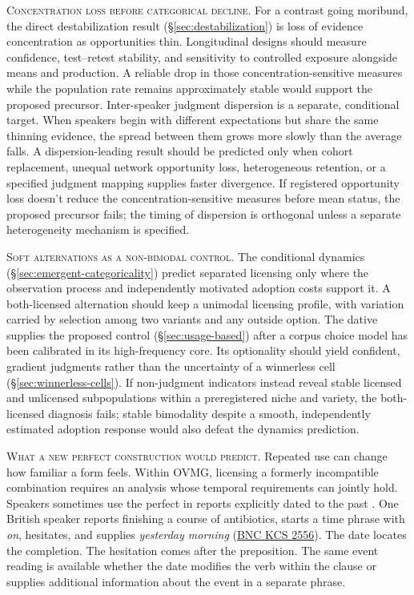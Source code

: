 \documentclass[12pt,letterpaper]{article}
\newcommand{\mention}[1]{\textit{#1}}
\begin{document}
\noindent\textsc{Concentration loss before categorical decline.} For a contrast
going moribund, the direct destabilization result
(\S\ref{sec:destabilization}) is loss of evidence concentration as
opportunities thin. Longitudinal designs should measure confidence,
test--retest stability, and sensitivity to controlled exposure alongside means
and production. A reliable drop in those concentration-sensitive measures while
the population rate remains approximately stable would support the proposed
precursor. Inter-speaker judgment dispersion is a separate, conditional target.
When speakers begin with different expectations but share the same thinning
evidence, the spread between them grows more slowly than the average falls. A
dispersion-leading result should be predicted only when cohort replacement,
unequal network opportunity loss, heterogeneous retention, or a specified
judgment mapping supplies faster divergence.
If registered opportunity loss doesn't reduce the concentration-sensitive
measures before mean status, the proposed precursor fails; the timing of
dispersion is orthogonal unless a separate heterogeneity mechanism is specified.

\noindent\textsc{Soft alternations as a non-bimodal control.} The conditional
dynamics (\S\ref{sec:emergent-categoricality}) predict separated licensing only
where the observation process and independently motivated adoption costs support
it. A both-licensed alternation should keep a unimodal licensing profile, with
variation carried by selection among two variants and any outside option. The
dative supplies the proposed control (\S\ref{sec:usage-based}) after a corpus
choice model has been calibrated in its high-frequency core. Its optionality
should yield confident, gradient judgments rather than the uncertainty of a
winnerless cell (\S\ref{sec:winnerless-cells}).
If non-judgment indicators instead reveal stable licensed and unlicensed
subpopulations within a preregistered niche and variety, the both-licensed
diagnosis fails; stable bimodality despite a smooth, independently estimated
adoption response would also defeat the dynamics prediction.

\noindent\textsc{What a new perfect construction would predict.} Repeated use
can change how familiar a form feels. Within OVMG, licensing a formerly
incompatible combination requires an analysis whose
temporal requirements can jointly hold. Speakers sometimes use the perfect
in reports explicitly dated to the past
\autocite{Werner2013DefiniteTemporalAdverbials,Werner2013TemporalAdverbials}.
One British speaker reports finishing a course of antibiotics, starts a time
phrase with \mention{on}, hesitates, and supplies \mention{yesterday morning}
(\href{https://www.phon.ox.ac.uk/SpokenBNCdata/KCS.html}{BNC KCS 2556}).
The date locates the completion. The hesitation comes after the preposition.
The same event reading is available whether the date modifies the verb
within the clause or supplies additional information about the event in a
separate phrase.
\end{document}
